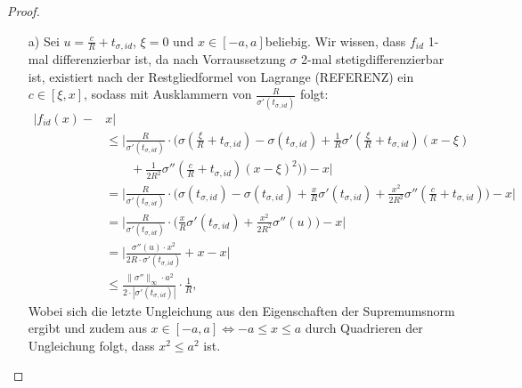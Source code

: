 \begin{proof}
	\begin{itemize}
  	\item[a)] Sei $u = \frac{c}{R} + t_{\sigma, id}$, $\xi = 0$ und  $x \in [-a, a]$beliebig. Wir wissen, dass $f_{id}$ 1-mal differenzierbar ist, da nach Vorraussetzung $\sigma$ 2-mal stetigdifferenzierbar ist,  existiert nach der Restgliedformel von Lagrange (REFERENZ) ein $c \in [\xi, x] $, sodass mit Ausklammern von $\frac{R}{\sigma'(t_{\sigma, id})} $ folgt$\colon
$
  	\begin{equation}
  	\begin{split}
  	 |f_{id}(x) -  & x| \\
  	& \leq \bigg|\frac{R}{\sigma'(t_{\sigma, id})} \cdot \bigg(\sigma\left(\frac{\xi}{R} + t_{\sigma, id}\right) - \sigma(t_{\sigma, id}) + \frac{1}{R} \sigma'\left(\frac{\xi}{R} + t_{\sigma, id}\right) (x - \xi) \\ & \qquad + \frac{1}{2R^2} \sigma''(\frac{c}{R} + t_{\sigma, id}) (x - \xi)^2)\bigg) - x \bigg| \\
  	& = \bigg|\frac{R}{\sigma'(t_{\sigma, id})} \cdot \bigg(\sigma(t_{\sigma, id}) - \sigma(t_{\sigma, id}) + \frac{x}{R} \sigma'(t_{\sigma, id}) + \frac{x^2}{2R^2} \sigma''(\frac{c}{R} + t_{\sigma, id})\bigg) - x\bigg| \\
  	& = \bigg|\frac{R}{\sigma'(t_{\sigma, id})} \cdot \bigg(\frac{x}{R} \sigma'(t_{\sigma, id}) + \frac{x^2}{2R^2}\sigma''(u)\bigg) - x\bigg| \\
  	& = \bigg| \frac{\sigma''(u) \cdot x^2}{2R \cdot \sigma'(t_{\sigma, id})} + x - x\big| \\
  	& \leq \frac{\| \sigma'' \|_{\infty} \cdot a^2}{2 \cdot |\sigma'(t_{\sigma, id})|} \cdot \frac{1}{R},  
  	\end{split}
  	\end{equation}
  	Wobei sich die letzte Ungleichung aus den Eigenschaften der Supremumsnorm ergibt und zudem aus $x \in [-a,a] \Leftrightarrow -a \leq x \leq a$ durch Quadrieren der Ungleichung folgt, dass $x^2 \leq a^2$ ist.
 	\end{itemize}
\end{proof}